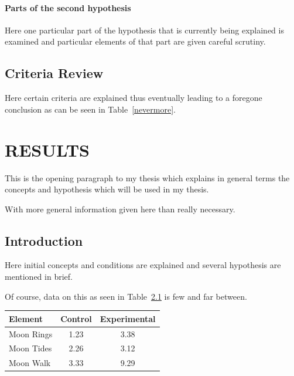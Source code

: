 \documentclass[11pt]{isuthesis}
\begin{document}
\subsubsection{Parts of the second hypothesis}

Here one particular part of the hypothesis that is 
currently being explained is examined and particular
elements of that part are given careful scrutiny.

\section{Criteria Review}

Here certain criteria are explained thus eventually
leading to a foregone conclusion as can be seen in
Table~\ref{nevermore}.

\begin{table}[h!tb] \centering
\setlength{\captionwidth}{3.5 in}
\label{nevermore}

\vspace{ 2 in}
\end{table}

\chapter{RESULTS}

This is the opening paragraph to my thesis which
explains in general terms the concepts and hypothesis
which will be used in my thesis.

With more general information given here than really
necessary.

\section{Introduction}

Here initial concepts and conditions are explained and
several hypothesis are mentioned in brief.

Of course, data on this as seen in Table~\ref{data}
is few and far between.

\begin{table}[h!tb] \centering
{}
\label{data}
\begin{tabular}{lcc} \hline
\textbf{Element} & \textbf{Control} & \textbf{Experimental} \\ \hline
Moon Rings & 1.23 & 3.38 \\
Moon Tides & 2.26 & 3.12 \\
Moon Walk & 3.33 & 9.29 \\ \hline
\end{tabular}
\end{table}
\end{document}

